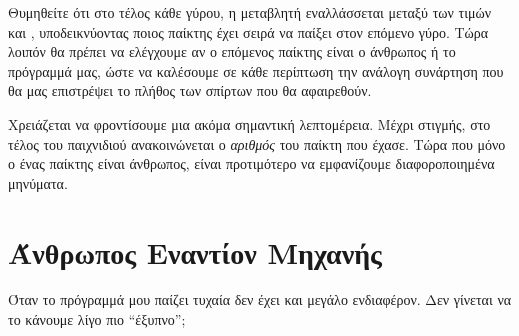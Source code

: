 \documentclass[a4paper,11pt,oneside]{book}
\begin{document}

Θυμηθείτε ότι στο τέλος κάθε γύρου, η μεταβλητή  εναλλάσσεται μεταξύ των τιμών  και , υποδεικνύοντας ποιος παίκτης έχει σειρά να παίξει στον επόμενο γύρο. Τώρα λοιπόν θα πρέπει να ελέγχουμε αν ο επόμενος παίκτης είναι ο άνθρωπος ή το πρόγραμμά μας, ώστε να καλέσουμε σε κάθε περίπτωση την ανάλογη συνάρτηση που θα μας επιστρέψει το πλήθος των σπίρτων που θα αφαιρεθούν.


Χρειάζεται να φροντίσουμε μια ακόμα σημαντική λεπτομέρεια. Μέχρι στιγμής, στο τέλος του παιχνιδιού ανακοινώνεται ο \emph{αριθμός} του παίκτη που έχασε. Τώρα που μόνο ο ένας παίκτης είναι άνθρωπος, είναι προτιμότερο να εμφανίζουμε διαφοροποιημένα μηνύματα.



\section{Άνθρωπος Εναντίον Μηχανής}

\begin{question}
Όταν το πρόγραμμά μου παίζει τυχαία δεν έχει και μεγάλο ενδιαφέρον. Δεν γίνεται να το κάνουμε λίγο πιο ``έξυπνο'';
\end{question} 
\end{document}
